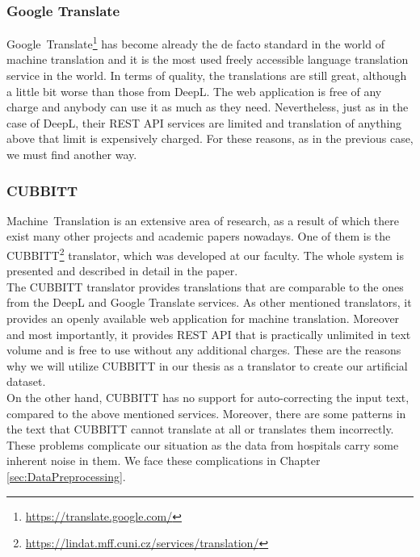 \subsubsection{Google Translate}
Google~Translate\footnote[12]{\url{https://translate.google.com/}} has become already the de facto standard in the world of machine translation and it is the most used freely accessible language translation service in the world. In terms of quality, the translations are still great, although a little bit worse than those from DeepL. The web application is free of any charge and anybody can use it as much as they need. Nevertheless, just as in the case of DeepL, their REST API services are limited and translation of anything above that limit is expensively charged. For these reasons, as in the previous case, we must find another way.

\subsubsection{CUBBITT}
\label{sec:Cubbitt}
Machine~Translation\citep{akhbardeh2021findings} is an extensive area of research, as a result of which there exist many other projects and academic papers nowadays. One of them is the CUBBITT\footnote[13]{\url{https://lindat.mff.cuni.cz/services/translation/}} translator, which was developed at our faculty. The whole system is presented and described in detail in the \citet{biblio:PoToTransformingmachine2020} paper.\\

The CUBBITT translator provides translations that are comparable to the ones from the DeepL and Google Translate services. As other mentioned translators, it provides an openly available web application for machine translation. Moreover and most importantly, it provides REST API that is practically unlimited in text volume and is free to use without any additional charges. These are the reasons why we will utilize CUBBITT in our thesis as a translator to create our artificial dataset.\\

On the other hand, CUBBITT has no support for auto-correcting the input text, compared to the above mentioned services. Moreover, there are some patterns in the text that CUBBITT cannot translate at all or translates them incorrectly. These problems complicate our situation as the data from hospitals carry some inherent noise in them. We face these complications in Chapter \ref{sec:DataPreprocessing}.

